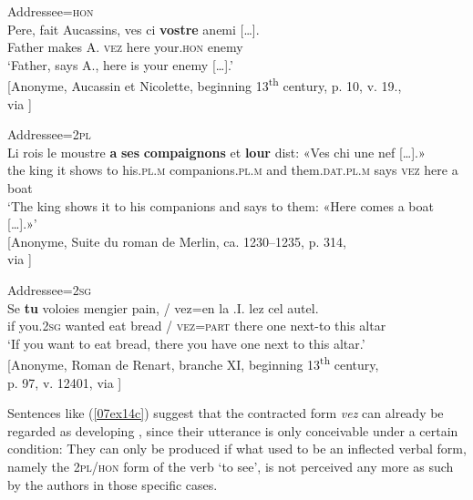 \documentclass[output=paper,colorlinks,citecolor=brown]{langscibook}
\begin{document}
\begin{exe}
	\ex \label{07ex14}
	\begin{xlist}
		\ex \label{07ex14a} Addressee=\textsc{hon}  \\
		\gll Pere, fait Aucassins, ves ci \textbf{vostre} anemi […]. \\
		Father makes A. \textsc{vez} here your.\textsc{hon} enemy \\
		\trans ‘Father, says A., here is your enemy […].’ \\
		\hfill [Anonyme, Aucassin et Nicolette, beginning 13\textsuperscript{th} century, p. 10, v. 19., \\
		\hfill via \cite{bfm2022}]
		
		\ex \label{07ex14b} Addressee=\textsc{2pl}  \\
		\gll Li rois le moustre \textbf{a} \textbf{ses} \textbf{compaignons} et \textbf{lour} dist: «Ves chi une nef […].» \\
		the king it shows to his.\textsc{pl.m} companions.\textsc{pl.m} and them.\textsc{dat.pl.m} says \textsc{vez} here a boat \\
		\trans ‘The king shows it to his companions and says to them: «Here comes a boat […].»’ \\
		\hfill [Anonyme, Suite du roman de Merlin, ca. 1230–1235, p. 314, \\
		\hfill via \cite{bfm2022}]
		
		\ex \label{07ex14c} Addressee=\textsc{2sg}  \\
		\gll Se \textbf{tu} voloies mengier pain, / vez=en la .I. lez cel autel. \\
		if you.\textsc{2sg} wanted eat bread / \textsc{vez}=\textsc{part} there one next-to this altar \\
		\trans ‘If you want to eat bread, there you have one next to this altar.’ \\
		\hfill [Anonyme, Roman de Renart, branche XI, beginning 13\textsuperscript{th} century, \\
		\hfill p. 97, v. 12401, via \cite{bfm2022}]
	\end{xlist}
\end{exe}

Sentences like (\ref{07ex14c}) suggest that the contracted form \emph{vez} can already be regarded as  developing , since their utterance is only conceivable under a certain condition: They can only be produced if what used to be an inflected verbal form, namely the \textsc{2pl/hon} form of the verb `to see', is not perceived any more as such by the authors in those specific cases.
\end{document}
